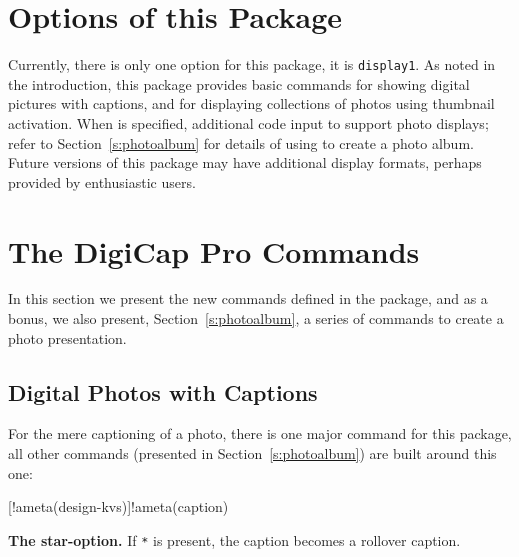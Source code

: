 \documentclass{article}
\begin{document}
\section{Options of this Package}

Currently, there is only one option for this package, it is
\texttt{display1}. As noted in the
introduction, this package provides basic commands for showing digital
pictures with captions, and for displaying collections of photos using
thumbnail activation. When  is specified, additional code input
to support photo displays; refer to Section~\ref{s:photoalbum} for details of
using  to create a photo album.  Future versions of this package
may have additional display formats, perhaps provided by enthusiastic users.


\section{The DigiCap Pro Commands}

In this section we present the new commands defined in the  package, and as a bonus,
we also present, Section~\ref{s:photoalbum}, a series of commands to create a photo presentation.

\subsection{Digital Photos with Captions}\label{ss:digiCap}

For the mere captioning of a photo, there is one major command for this
package, all other commands (presented in Section~\ref{s:photoalbum}) are built around this one:
\bVerb{}%
\begin{dCmd*}[commandchars=!()]{\bxSize}
[!ameta(design-kvs)]{!ameta(caption)}
\end{dCmd*}
\eVerb
\textbf{The star-option.} If \texttt{*} is present, the caption becomes a rollover caption.
\end{document}
